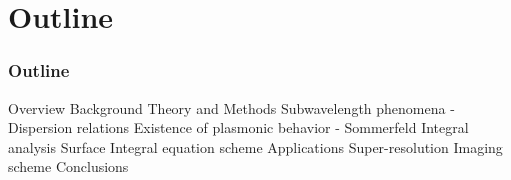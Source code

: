 \documentclass[mathserif,16pt,xcolor=table]{beamer}
\begin{document}
\section{Outline}
\begin{frame}
  \frametitle{Outline}
  \begin{outline}[itemize]
    \1 Overview
    \1 Background
    \1 Theory and Methods
      \2 Subwavelength phenomena - Dispersion relations
      \2 Existence of plasmonic behavior - Sommerfeld Integral analysis
      \2 Surface Integral equation scheme
    \1 Applications
      \2 Super-resolution Imaging scheme
    \1 Conclusions
  \end{outline}
\end{frame}
\end{document}
